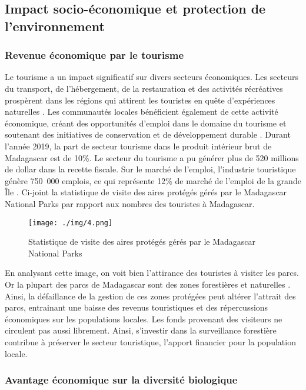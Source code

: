 \subsection{Impact socio-économique et protection de l’environnement}
\subsubsection{Revenue économique par le tourisme}
Le tourisme a un impact significatif sur divers secteurs économiques. Les secteurs du transport, de l'hébergement, de la restauration et des activités récréatives prospèrent dans les régions qui attirent les touristes en quête d'expériences naturelles \cite{23}. Les communautés locales bénéficient également de cette activité économique, créant des opportunités d'emploi dans le domaine du tourisme et soutenant des initiatives de conservation et de développement durable \cite{24}. Durant l’année 2019, la part de secteur tourisme dans le produit intérieur brut de Madagascar est de 10\%. Le secteur du tourisme a pu générer plus de 520 millions de dollar dans la recette fiscale. Sur le marché de l’emploi, l’industrie touristique génère 750 000 emplois, ce qui représente 12\% de marché de l’emploi de la grande Île \cite{25}.
Ci-joint la statistique de visite des aires protégés gérés par le Madagascar National Parks par rapport aux nombres des touristes à Madagascar.

\begin{figure}[H]
	\centering
	\texttt{[image: ./img/4.png]}
	\caption{Statistique de visite des aires protégés gérés par le Madagascar National Parks}
\end{figure}

En analysant cette image, on voit bien l’attirance des touristes à visiter les parcs. Or la plupart des parcs de Madagascar sont des zones forestières et naturelles \cite{26}.
\\

Ainsi, la défaillance de la gestion de ces zones protégées peut altérer l’attrait des parcs, entrainant une baisse des revenus touristiques et des répercussions économiques sur les populations locales. Les fonds provenant des visiteurs ne circulent pas aussi librement. Ainsi, s’investir dans la surveillance forestière contribue à préserver le secteur touristique, l’apport financier pour la population locale.

\subsubsection{Avantage économique sur la diversité biologique}

